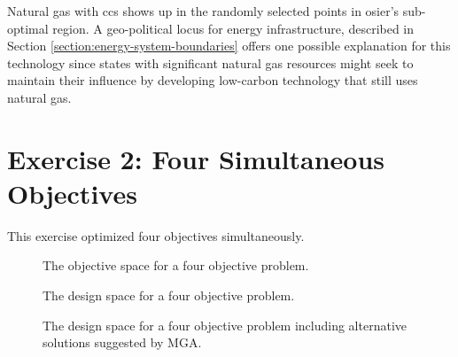 Natural gas with \ac{ccs} shows up in the randomly selected points in
\ac{osier}'s sub-optimal region. A geo-political locus for energy
infrastructure, described in Section \ref{section:energy-system-boundaries}
offers one possible explanation for this technology since states with
significant natural gas resources might seek to maintain their influence by
developing low-carbon technology that still uses natural gas.






\section{Exercise 2: Four Simultaneous Objectives}
This exercise optimized four objectives simultaneously.

\begin{figure}[h]
  \centering
  \resizebox{\columnwidth}{!}{}
  \caption{The objective space for a four objective problem.}
  \label{fig:4-obj-design}
\end{figure}



\begin{figure}[h]
  \centering
  \resizebox{\columnwidth}{!}{}
  \caption{The design space for a four objective problem.}
  \label{fig:4-obj-design}
\end{figure}


\begin{figure}[h]
  \centering
  \resizebox{\columnwidth}{!}{}
  \caption{The design space for a four objective problem including alternative solutions suggested by MGA.}
  \label{fig:4-obj-design}
\end{figure}